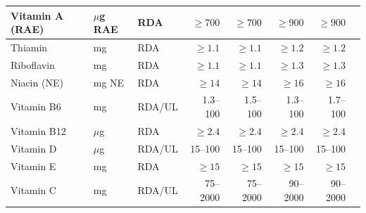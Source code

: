 \begin{tabularx}{\textwidth}{lllrrrrX}
\midrule
Vitamin A (RAE) & $\mu$g RAE & RDA & $\geq 700$ & $\geq 700$ & $\geq 900$ & $\geq 900$ & \cite{healthcanada2025vitamins} \\
\midrule
Thiamin & mg & RDA & $\geq 1.1$ & $\geq 1.1$ & $\geq 1.2$ & $\geq 1.2$ & \cite{healthcanada2025vitamins} \\
\midrule
Riboflavin & mg & RDA & $\geq 1.1$ & $\geq 1.1$ & $\geq 1.3$ & $\geq 1.3$ & \cite{healthcanada2025vitamins} \\
\midrule
Niacin (NE) & mg NE & RDA & $\geq 14$ & $\geq 14$ & $\geq 16$ & $\geq 16$ & \cite{healthcanada2025vitamins} \\
\midrule
Vitamin B6 & mg & RDA/UL & 1.3--100 & 1.5--100 & 1.3--100 & 1.7--100 & \cite{healthcanada2025vitamins} \\
\midrule
Vitamin B12 & $\mu$g & RDA & $\geq 2.4$ & $\geq 2.4$ & $\geq 2.4$ & $\geq 2.4$ & \cite{healthcanada2025vitamins} \\
\midrule
Vitamin D & $\mu$g & RDA/UL & 15--100 & 15--100 & 15--100 & 15--100 & \cite{healthcanada2025vitamins} \\
\midrule
Vitamin E & mg & RDA & $\geq 15$ & $\geq 15$ & $\geq 15$ & $\geq 15$ & \cite{healthcanada2025vitamins} \\
\midrule
Vitamin C & mg & RDA/UL & 75--2000 & 75--2000 & 90--2000 & 90--2000 & \cite{healthcanada2025vitamins} \\
\midrule
\bottomrule
\end{tabularx}
